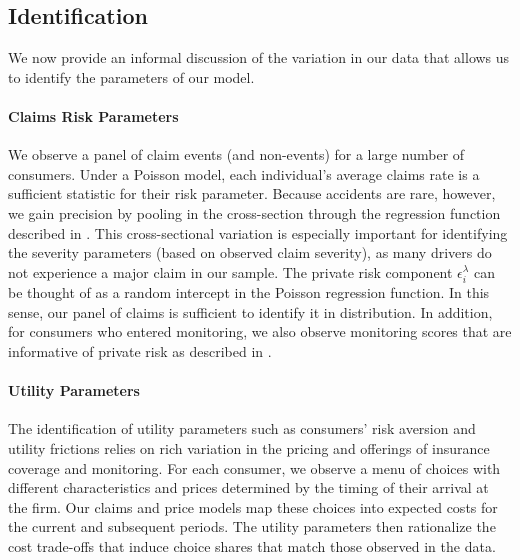 \subsection{Identification\label{sec:identification}}

We now provide an informal discussion of the variation in our data that allows us to identify the parameters of our model.

\paragraph{Claims Risk Parameters} We observe a panel of claim events (and non-events) for a large number of consumers. Under a Poisson model, each individual's average claims rate is a sufficient statistic for their risk parameter. Because accidents are rare, however, we gain precision by pooling in the cross-section through the regression function described in . This cross-sectional variation is especially important for identifying the severity parameters (based on observed claim severity), as many drivers do not experience a major claim in our sample. The private risk component $\epsilon^{\lambda}_{i}$ can be thought of as a random intercept in the Poisson regression function. In this sense, our panel of claims is sufficient to identify it in distribution. In addition, for consumers who entered monitoring, we also observe monitoring scores that are informative of private risk as described in .

\paragraph{Utility Parameters}
The identification of utility parameters such as consumers' risk aversion and utility frictions relies on rich variation in the pricing and offerings of insurance coverage and monitoring.
For each consumer, we observe a menu of choices with different characteristics and prices determined by the timing of their arrival at the firm. Our claims and price models map these choices into expected costs for the current and subsequent periods. The utility parameters then rationalize the cost trade-offs that induce choice shares that match those observed in the data.

